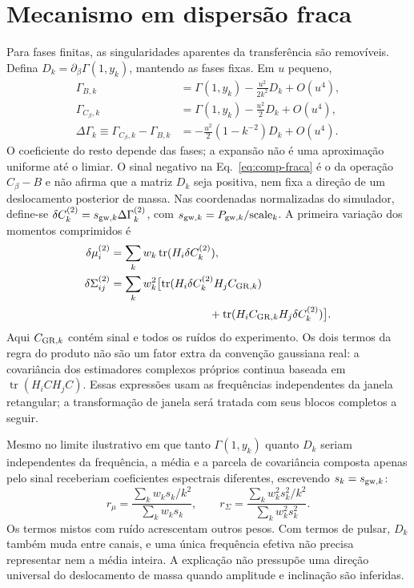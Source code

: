 \section{Mecanismo em dispersão fraca}

Para fases finitas, as singularidades aparentes da transferência são removíveis.
Defina \(D_k=\partial_\beta\Gamma(1,y_k)\), mantendo as fases fixas.
Em \(u\) pequeno,
\begin{align}
 \Gamma_{B,k}&=\Gamma(1,y_k)-\frac{u^2}{2k^2}D_k+O(u^4),\nonumber\\
 \Gamma_{C_\beta,k}&=\Gamma(1,y_k)-\frac{u^2}{2}D_k+O(u^4),\nonumber\\
 \Delta\Gamma_k\equiv\Gamma_{C_\beta,k}-\Gamma_{B,k}&=-\frac{u^2}{2}(1-k^{-2})D_k+O(u^4).
 \label{eq:comp-fraca}
\end{align}
O coeficiente do resto depende das fases; a expansão não é uma aproximação
uniforme até o limiar. O sinal negativo na Eq.~\eqref{eq:comp-fraca} é o da
operação $C_\beta-B$ e não afirma que a matriz $D_k$ seja positiva, nem fixa
a direção de um deslocamento posterior de massa.
Nas coordenadas normalizadas do simulador, define-se
$\delta C_k^{(2)}=s_{{\rm gw},k}\Delta\Gamma_k^{(2)}$,
com $s_{{\rm gw},k}=P_{{\rm gw},k}/\mathrm{scale}_k$.
A primeira variação dos momentos comprimidos é
\begin{align}
 \delta\mu_i^{(2)}
 &=\sum_k w_k\operatorname{tr}(H_i\delta C_k^{(2)}),\nonumber\\
 \delta\Sigma_{ij}^{(2)}
 &=\sum_k w_k^2\bigl[
 \operatorname{tr}(H_i\delta C_k^{(2)}H_jC_{{\rm GR},k})\nonumber\\
 &\hspace{31mm}+\operatorname{tr}(H_iC_{{\rm GR},k}H_j\delta C_k^{(2)})\bigr].
 \label{eq:comp-g2-momentos-primeira-ordem}
\end{align}
Aqui $C_{{\rm GR},k}$ contém sinal e todos os ruídos do experimento.
Os dois termos da regra do produto não são um fator extra da convenção
gaussiana real: a covariância dos estimadores complexos próprios continua
baseada em $\operatorname{tr}(H_iCH_jC)$. Essas expressões usam as frequências
independentes da janela retangular; a transformação de janela será tratada
com seus blocos completos a seguir.

Mesmo no limite ilustrativo em que tanto \(\Gamma(1,y_k)\) quanto
\(D_k\) seriam independentes da frequência,
a média e a parcela de covariância composta apenas pelo sinal receberiam
coeficientes espectrais diferentes, escrevendo $s_k=s_{{\rm gw},k}$:
\begin{equation}
 r_\mu=\frac{\sum_kw_ks_k/k^2}{\sum_kw_ks_k},\qquad
 r_\Sigma=\frac{\sum_kw_k^2s_k^2/k^2}{\sum_kw_k^2s_k^2}.
 \label{eq:comp-frequencia-efetiva}
\end{equation}
Os termos mistos com ruído acrescentam outros pesos. Com termos de pulsar,
\(D_k\) também muda entre canais, e uma única frequência efetiva não precisa
representar nem a média inteira. A explicação não pressupõe uma direção
universal do deslocamento de massa quando amplitude e inclinação são inferidas.

